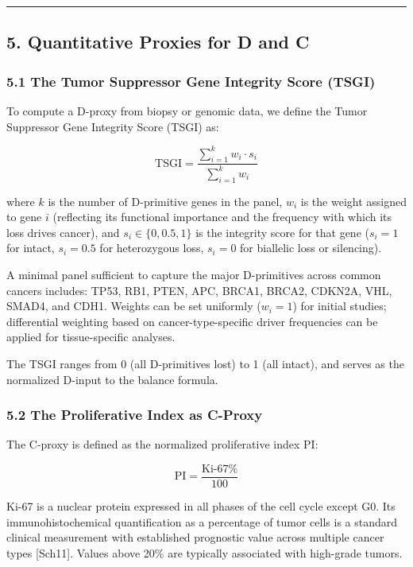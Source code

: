 \documentclass[
  11pt,
  letterpaper,
]{article}
\begin{document}
\begin{center}\rule{0.5\linewidth}{0.5pt}\end{center}

\subsection{5. Quantitative Proxies for D and
C}\label{quantitative-proxies-for-d-and-c}

\subsubsection{5.1 The Tumor Suppressor Gene Integrity Score
(TSGI)}\label{the-tumor-suppressor-gene-integrity-score-tsgi}

To compute a D-proxy from biopsy or genomic data, we define the Tumor
Suppressor Gene Integrity Score (TSGI) as:

\[\text{TSGI} = \frac{\sum_{i=1}^{k} w_i \cdot s_i}{\sum_{i=1}^{k} w_i}\]

where \(k\) is the number of D-primitive genes in the panel, \(w_i\) is
the weight assigned to gene \(i\) (reflecting its functional importance
and the frequency with which its loss drives cancer), and
\(s_i \in \{0, 0.5, 1\}\) is the integrity score for that gene
(\(s_i = 1\) for intact, \(s_i = 0.5\) for heterozygous loss,
\(s_i = 0\) for biallelic loss or silencing).

A minimal panel sufficient to capture the major D-primitives across
common cancers includes: TP53, RB1, PTEN, APC, BRCA1, BRCA2, CDKN2A,
VHL, SMAD4, and CDH1. Weights can be set uniformly (\(w_i = 1\)) for
initial studies; differential weighting based on cancer-type-specific
driver frequencies can be applied for tissue-specific analyses.

The TSGI ranges from 0 (all D-primitives lost) to 1 (all intact), and
serves as the normalized D-input to the balance formula.

\subsubsection{5.2 The Proliferative Index as
C-Proxy}\label{the-proliferative-index-as-c-proxy}

The C-proxy is defined as the normalized proliferative index
\(\text{PI}\):

\[\text{PI} = \frac{\text{Ki-67\%}}{100}\]

Ki-67 is a nuclear protein expressed in all phases of the cell cycle
except G0. Its immunohistochemical quantification as a percentage of
tumor cells is a standard clinical measurement with established
prognostic value across multiple cancer types {[}Sch11{]}. Values above
20\% are typically associated with high-grade tumors.
\end{document}
